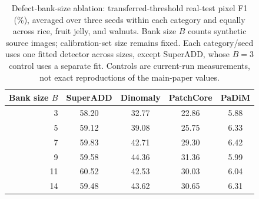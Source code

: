 \begin{table}[t]
    \centering
    \small
    \caption{Defect-bank-size ablation: transferred-threshold real-test pixel
    F1 (\%), averaged over three seeds within each category and equally across
    rice, fruit jelly, and walnuts. Bank size $B$ counts synthetic source
    images; calibration-set size remains fixed. Each category/seed uses one
    fitted detector across sizes, except SuperADD, whose $B=3$ control uses
    a separate fit. Controls are current-run measurements, not exact
    reproductions of the main-paper values.}
    \label{tab:defect_bank_size_ablation}
    \begin{tabular}{rcccc}
        \hline
        Bank size $B$ & SuperADD & Dinomaly & PatchCore & PaDiM \\
        \hline
        3  & 58.20 & 32.77 & 22.86 & 5.88 \\
        5  & 59.12 & 39.08 & 25.75 & 6.33 \\
        7  & 59.83 & 42.71 & 29.30 & 6.42 \\
        9  & 59.58 & 44.36 & 31.36 & 5.99 \\
        11 & 60.52 & 42.53 & 30.03 & 6.04 \\
        14 & 59.48 & 43.62 & 30.65 & 6.31 \\
        \hline
    \end{tabular}
\end{table}
